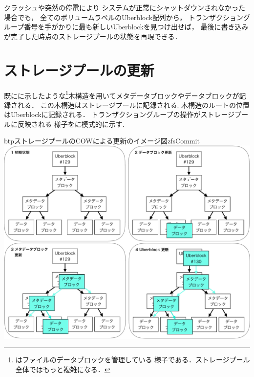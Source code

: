 クラッシュや突然の停電により
システムが正常にシャットダウンされなかった場合でも，
全てのボリュームラベルのUberblock配列から，
トランザクショングループ番号を手がかりに最も新しいUberblockを見つけ出せば，
最後に書き込みが完了した時点のストレージプールの状態を再現できる．


\section{ストレージプールの更新}
既にに示したような\footnote{
  はファイルのデータブロックを管理している
  様子である．ストレージプール全体ではもっと複雑になる．
}木構造を用いてメタデータブロックやデータブロックが記録される．
この木構造はストレージプールに記録される.
木構造のルートの位置はUberblockに記録される．
トランザクショングループの操作がストレージプールに反映される
様子をに模式的に示す.

\begin{myfig}{btp}{ストレージプールのCOWによる更新のイメージ図}{zfsCommit}
  \centering\includegraphics[scale=0.6]{Fig/zfsCommit-crop.pdf}
\end{myfig}

